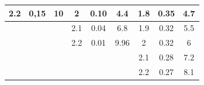 \documentclass[a4paper,14pt]{extreport}
\begin{document}
\begin{table}[h!]
\begin{tabular}{|ccc|ccc|ccc|}
\multicolumn{1}{|c|}{2.2}    & \multicolumn{1}{c|}{0,15}   & 10     & \multicolumn{1}{c|}{2}      & \multicolumn{1}{c|}{0.10}   & 4.4   & \multicolumn{1}{c|}{1.8}    & \multicolumn{1}{c|}{0.35}   & 4.7   \\ \hline
\multicolumn{1}{|c|}{}       & \multicolumn{1}{c|}{}       &        & \multicolumn{1}{c|}{2.1}    & \multicolumn{1}{c|}{0.04}   & 6.8   & \multicolumn{1}{c|}{1.9}    & \multicolumn{1}{c|}{0.32}   & 5.5   \\ \hline
\multicolumn{1}{|c|}{}       & \multicolumn{1}{c|}{}       &        & \multicolumn{1}{c|}{2.2}    & \multicolumn{1}{c|}{0.01}   & 9.96  & \multicolumn{1}{c|}{2}      & \multicolumn{1}{c|}{0.32}   & 6     \\ \hline
\multicolumn{1}{|c|}{}       & \multicolumn{1}{c|}{}       &        & \multicolumn{1}{c|}{}       & \multicolumn{1}{c|}{}       &       & \multicolumn{1}{c|}{2.1}    & \multicolumn{1}{c|}{0.28}   & 7.2   \\ \hline
\multicolumn{1}{|c|}{}       & \multicolumn{1}{c|}{}       &        & \multicolumn{1}{c|}{}       & \multicolumn{1}{c|}{}       &       & \multicolumn{1}{c|}{2.2}    & \multicolumn{1}{c|}{0.27}   & 8.1   \\ \hline
\end{tabular}
\end{table}
\end{document}
